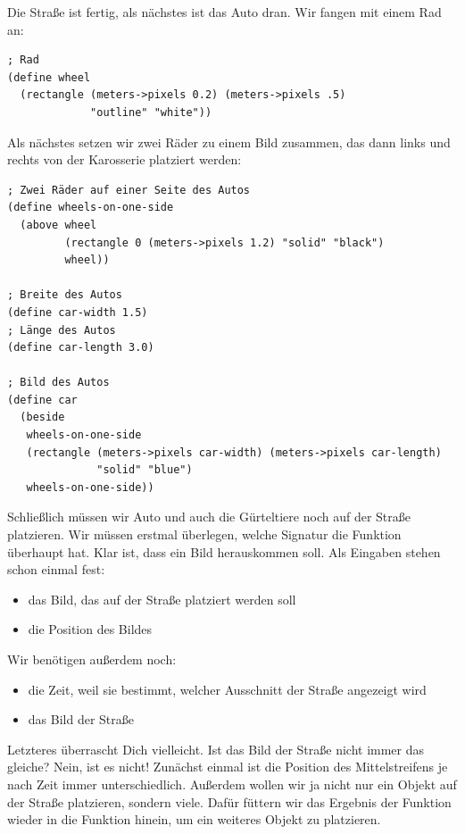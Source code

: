 Die Straße ist fertig, als nächstes ist das Auto dran.  Wir fangen mit
einem Rad an:
%
\begin{lstlisting}
; Rad
(define wheel
  (rectangle (meters->pixels 0.2) (meters->pixels .5)
             "outline" "white"))
\end{lstlisting}
%
Als nächstes setzen wir zwei Räder zu einem Bild zusammen, das dann
links und rechts von der Karosserie platziert werden:
%
\begin{lstlisting}
; Zwei Räder auf einer Seite des Autos
(define wheels-on-one-side
  (above wheel
         (rectangle 0 (meters->pixels 1.2) "solid" "black")
         wheel))

; Breite des Autos
(define car-width 1.5)
; Länge des Autos
(define car-length 3.0)
 
; Bild des Autos
(define car
  (beside
   wheels-on-one-side
   (rectangle (meters->pixels car-width) (meters->pixels car-length)
              "solid" "blue")
   wheels-on-one-side))
\end{lstlisting}
%
Schließlich müssen wir Auto und auch die Gürteltiere noch auf der
Straße platzieren.  Wir müssen erstmal überlegen, welche Signatur die
Funktion überhaupt hat.  Klar ist, dass ein Bild herauskommen soll.
Als Eingaben stehen schon einmal fest:
%
\begin{itemize}
\item das Bild, das auf der Straße platziert werden soll
\item die Position des Bildes
\end{itemize}
%
Wir benötigen außerdem noch:
%
\begin{itemize}
\item die Zeit, weil sie bestimmt, welcher Ausschnitt der Straße
  angezeigt wird
\item das Bild der Straße
\end{itemize}
%
Letzteres überrascht Dich vielleicht. Ist das Bild der Straße nicht
immer das gleiche?  Nein, ist es nicht!  Zunächst einmal ist die
Position des Mittelstreifens je nach Zeit immer unterschiedlich.
Außerdem wollen wir ja nicht nur ein Objekt auf der Straße platzieren,
sondern viele.  Dafür füttern wir das Ergebnis der Funktion wieder in
die Funktion hinein, um ein weiteres Objekt zu platzieren.

